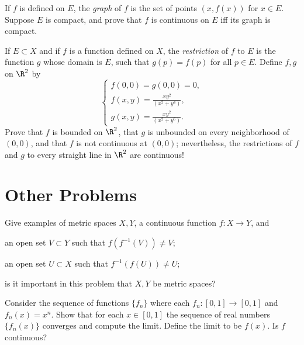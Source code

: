\documentclass{assignment}
\begin{document}
\begin{question}[4.6*]
  If $f$ is defined on $E$, the \emph{graph} of $f$ is the set of points $(x, f(x))$ for $x\in E$.
Suppose $E$ is compact, and prove that $f$ is continuous on $E$ iff its graph is compact.
\end{question}

\begin{question}[7]
  If $E\subset X$ and if $f$ is a function defined on $X$, the \emph{restriction} of $f$ to $E$ is
the function $g$ whose domain is $E$, such that $g(p) = f(p)$ for all $p\in E$. Define $f,g$ on
$\R^2$ by $$\begin{cases} f(0,0) = g(0,0) = 0, \\ f(x,y) = \frac{xy^2}{(x^2 + y^4)}, \\ g(x,y) = 
\frac{xy^2}{(x^2 + y^6)}. \end{cases}$$Prove that $f$ is bounded on $\R^2$, that $g$ is unbounded on
every neighborhood of $(0,0)$, and that $f$ is not continuous at $(0,0)$; nevertheless, the
restrictions of $f$ and $g$ to every straight line in $\R^2$ are continuous!
\end{question}

\section*{Other Problems}
\begin{question}[1]
 Give examples of metric spaces  $X,Y$, a continuous function $f: X\to Y$, and 
\begin{qparts}
  \item an open set $V\subset Y$ such that $f(f^{-1}(V)) \neq V$;
  \item an open set $U\subset X$ such that $f^{-1}(f(U)) \neq U$;
  \item is it important in this problem that $X, Y$ be metric spaces?  
\end{qparts}
\end{question}

\begin{question}[2]
  Consider the sequence of functions $\{f_n\}$ where each $f_n: [0,1] \to [0,1]$ and $f_n(x) = x^n$.
Show that for each $x\in [0,1]$ the sequence of real numbers $\{f_n(x)\}$ converges and compute the 
limit. Define the limit to be $f(x)$. Is $f$ continuous?
\end{question}
\end{document}
